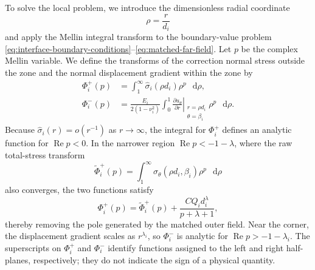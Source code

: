 \documentclass[pdflatex,iicol,sn-mathphys-ay]{sn-jnl}
\newcommand{\dd}{\mathop{}\!\mathrm{d}}
\begin{document}
To solve the local problem, we introduce the dimensionless radial coordinate
\begin{equation*}
  \rho=\frac{r}{d_i}
\end{equation*}
and apply the Mellin integral transform to the boundary-value problem
\eqref{eq:interface-boundary-conditions}--\eqref{eq:matched-far-field}.
Let $p$ be the complex Mellin variable. We define the transforms of the
correction normal stress outside the zone and the normal displacement
gradient within the zone by
\begin{equation*}
\begin{aligned}
  \Phi_i^+(p)
    &=\int_1^\infty
      \widehat{\sigma}_i(\rho d_i)\rho^p\,\dd\rho,\\
  \Phi_i^-(p)
    &=\frac{E_i}{2(1-\nu_i^2)}
      \int_0^1
      \left.
      \frac{\partial u_\theta}{\partial r}
      \right|_{\substack{r=\rho d_i\\\theta=\beta_i}}
      \rho^p\,\dd\rho.
\end{aligned}
\end{equation*}
Because $\widehat{\sigma}_i(r)=o(r^{-1})$ as $r\to\infty$, the integral
for $\Phi_i^+$ defines an analytic function for
$\operatorname{Re}p<0$. In the narrower region
$\operatorname{Re}p<-1-\lambda$, where the raw total-stress transform
\begin{equation*}
  \widetilde{\Phi}_i^+(p)
  =\int_1^\infty
    \sigma_\theta(\rho d_i,\beta_i)\rho^p\,\dd\rho
\end{equation*}
also converges, the two functions satisfy
\begin{equation*}
  \Phi_i^+(p)
  =\widetilde{\Phi}_i^+(p)
   +\frac{CQ_i d_i^\lambda}{p+\lambda+1},
\end{equation*}
thereby removing the pole generated by the matched outer field. Near the
corner, the displacement gradient scales as $r^{\lambda_i}$, so
$\Phi_i^-$ is analytic for $\operatorname{Re}p>-1-\lambda_i$. The superscripts on $\Phi_i^+$ and
$\Phi_i^-$ identify functions assigned to the left and right half-planes,
respectively; they do not indicate the sign of a physical quantity.
\end{document}
